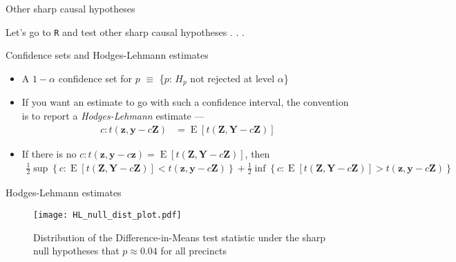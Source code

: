 \documentclass[table, xcolor={dvipsnames}, 9pt]{beamer}
\theoremstyle{newstyle}
\DeclareMathOperator{\E}{\mathrm{E}}
\begin{document}
\begin{frame}{Other sharp causal hypotheses}

\begin{center}
Let's go to \texttt{R} and test other sharp causal hypotheses . . . 
\end{center}

\end{frame}
\begin{frame}{Confidence sets and Hodges-Lehmann estimates} 
\begin{itemize}
\item A $1-\alpha$ confidence set for $p$ $\equiv $ \{$p$: $H_{p}$ not rejected at level $\alpha$\}
\item If you want an estimate to go with such a confidence interval, the convention is to report a \textit{Hodges-Lehmann} estimate ---
\begin{align*}
c: t\left(\mathbf{z}, \mathbf{y} - c\mathbf{Z}\right) & = \E\left[t\left(\mathbf{Z}, \mathbf{Y} - c\mathbf{Z}\right)\right]
\end{align*}
\item If there is no $c: t\left(\mathbf{z}, \mathbf{y} - c\mathbf{z}\right) = \E\left[t\left(\mathbf{Z}, \mathbf{Y} - c\mathbf{Z}\right)\right]$, then 
\footnotesize{\begin{align*}
\frac{1}{2} \sup \left\{c: \E\left[t\left(\mathbf{Z}, \mathbf{Y} - c\mathbf{Z}\right)\right] < t\left(\mathbf{z}, \mathbf{y} - c\mathbf{Z}\right)\right\}  + \frac{1}{2} \inf \left\{c: \E\left[t\left(\mathbf{Z}, \mathbf{Y} - c\mathbf{Z}\right)\right] > t\left(\mathbf{z}, \mathbf{y} - c\mathbf{Z}\right)\right\}
\end{align*}} \normalsize 
\end{itemize}
\end{frame}
\begin{frame}{Hodges-Lehmann estimates} 
\begin{figure}[H]
\texttt{[image: HL\_null\_dist\_plot.pdf]}
\caption{Distribution of the Difference-in-Means test statistic under the sharp null hypotheses that $p \approx 0.04$ for all precincts}
\end{figure}
\end{frame}
\end{document}
